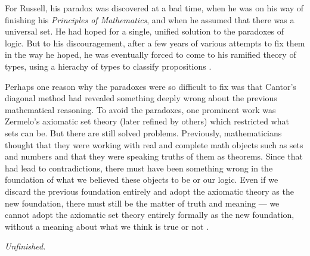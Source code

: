 \documentclass{article}
\begin{document}
For Russell, his paradox was discovered at a bad time, when he was on his way
of finishing his \emph{Principles of Mathematics}, and when he assumed that
there was a universal set. He had hoped for a single, unified solution to the
paradoxes of logic. But to his discouragement, after a few years of various
attempts to fix them in the way he hoped, he was eventually forced to come to
his ramified theory of types, using a hierachy of types to classify
propositions \cite{companion.to.russell.tt}.

Perhaps one reason why the paradoxes were so difficult to fix was that Cantor's
diagonal method had revealed something deeply wrong about the previous
mathematical reasoning. To avoid the paradoxes, one prominent work was
Zermelo's axiomatic set theory (later refined by others) which restricted what
sets can be. But there are still solved problems. Previously, mathematicians
thought that they were working with real and complete math objects such as sets
and numbers and that they were speaking truths of them as theorems. Since that
had lead to contradictions, there must have been something wrong in the
foundation of what we believed these objects to be or our logic. Even if we
discard the previous foundation entirely and adopt the axiomatic theory as the
new foundation, there must still be the matter of truth and meaning --- we
cannot adopt the axiomatic set theory entirely formally as the new foundation,
without a meaning about what we think is true or not \cite[Ch.~12]{kleeneitmm}.

\emph{Unfinished.}



\end{document}
